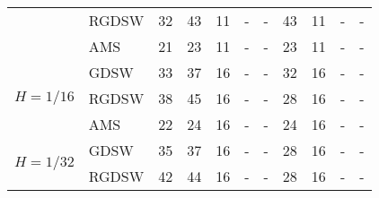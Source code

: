 \begin{table}[H]
\begin{tabular}{llrrrllrrll}
\cline{2-11}
\bfseries  & RGDSW & 32 & {\cellcolor[HTML]{004529}} \color[HTML]{F1F1F1} 43 & 11 & {\cellcolor[HTML]{BCE395}} \color[HTML]{000000} {\cellcolor[HTML]{ADD8E6}} - & - & {\cellcolor[HTML]{379E54}} \color[HTML]{F1F1F1} 43 & 11 & {\cellcolor[HTML]{FFFFE5}} \color[HTML]{000000} {\cellcolor[HTML]{ADD8E6}} - & - \\
\cline{2-11}
\bfseries  & AMS & 21 & {\cellcolor[HTML]{004529}} \color[HTML]{F1F1F1} 23 & 11 & {\cellcolor[HTML]{BCE395}} \color[HTML]{000000} {\cellcolor[HTML]{ADD8E6}} - & - & {\cellcolor[HTML]{379E54}} \color[HTML]{F1F1F1} 23 & 11 & {\cellcolor[HTML]{FFFFE5}} \color[HTML]{000000} {\cellcolor[HTML]{ADD8E6}} - & - \\
\cline{1-11} \cline{2-11}
\multirow[c]{3}{*}{\bfseries $H=1/16$} & GDSW & 33 & {\cellcolor[HTML]{BCE395}} \color[HTML]{000000} 37 & 16 & {\cellcolor[HTML]{004529}} \color[HTML]{F1F1F1} {\cellcolor[HTML]{ADD8E6}} - & - & {\cellcolor[HTML]{379E54}} \color[HTML]{F1F1F1} 32 & 16 & {\cellcolor[HTML]{FFFFE5}} \color[HTML]{000000} {\cellcolor[HTML]{ADD8E6}} - & - \\
\cline{2-11}
\bfseries  & RGDSW & 38 & {\cellcolor[HTML]{004529}} \color[HTML]{F1F1F1} 45 & 16 & {\cellcolor[HTML]{BCE395}} \color[HTML]{000000} {\cellcolor[HTML]{ADD8E6}} - & - & {\cellcolor[HTML]{379E54}} \color[HTML]{F1F1F1} 28 & 16 & {\cellcolor[HTML]{FFFFE5}} \color[HTML]{000000} {\cellcolor[HTML]{ADD8E6}} - & - \\
\cline{2-11}
\bfseries  & AMS & 22 & {\cellcolor[HTML]{004529}} \color[HTML]{F1F1F1} 24 & 16 & {\cellcolor[HTML]{BCE395}} \color[HTML]{000000} {\cellcolor[HTML]{ADD8E6}} - & - & {\cellcolor[HTML]{379E54}} \color[HTML]{F1F1F1} 24 & 16 & {\cellcolor[HTML]{FFFFE5}} \color[HTML]{000000} {\cellcolor[HTML]{ADD8E6}} - & - \\
\cline{1-11} \cline{2-11}
\multirow[c]{3}{*}{\bfseries $H=1/32$} & GDSW & 35 & {\cellcolor[HTML]{004529}} \color[HTML]{F1F1F1} 37 & 16 & {\cellcolor[HTML]{BCE395}} \color[HTML]{000000} {\cellcolor[HTML]{ADD8E6}} - & - & {\cellcolor[HTML]{379E54}} \color[HTML]{F1F1F1} 28 & 16 & {\cellcolor[HTML]{FFFFE5}} \color[HTML]{000000} {\cellcolor[HTML]{ADD8E6}} - & - \\
\cline{2-11}
\bfseries  & RGDSW & 42 & {\cellcolor[HTML]{004529}} \color[HTML]{F1F1F1} 44 & 16 & {\cellcolor[HTML]{BCE395}} \color[HTML]{000000} {\cellcolor[HTML]{ADD8E6}} - & - & {\cellcolor[HTML]{379E54}} \color[HTML]{F1F1F1} 28 & 16 & {\cellcolor[HTML]{FFFFE5}} \color[HTML]{000000} {\cellcolor[HTML]{ADD8E6}} - & - \\

\end{tabular}
\end{table}
